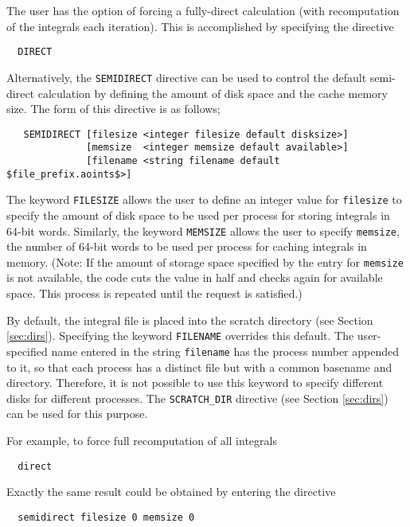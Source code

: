 The user has the option of forcing a fully-direct calculation (with
recomputation of the integrals each iteration).  This is accomplished
by specifying the directive

\begin{verbatim}
  DIRECT
\end{verbatim}

Alternatively, the \verb+SEMIDIRECT+ directive can be used to control
the default semi-direct calculation by defining the amount of disk
space and the cache memory size.  The form of this directive is as
follows;

\begin{verbatim}
   SEMIDIRECT [filesize <integer filesize default disksize>] 
              [memsize  <integer memsize default available>]
              [filename <string filename default $file_prefix.aoints$>]
\end{verbatim}

The keyword \verb+FILESIZE+ allows the user to define an integer value
for \verb+filesize+ to specify the amount of disk space to be used per
process for storing integrals in 64-bit words.  Similarly, the keyword
\verb+MEMSIZE+ allows the user to specify \verb+memsize+, the number
of 64-bit words to be used per process for caching integrals in
memory. (Note: If the amount of storage space specified by the entry
for \verb+memsize+ is not available, the code cuts the value in half
and checks again for available space.  This process is repeated until
the request is satisfied.)  

By default, the integral file is placed into the scratch directory
(see Section \ref{sec:dirs}). Specifying the keyword \verb+FILENAME+
overrides this default.  The user-specified name entered in the string
\verb+filename+ has the process number appended to it, so that each
process has a distinct file but with a common basename and directory.
Therefore, it is not possible to use this keyword to specify different
disks for different processes.  The \verb+SCRATCH_DIR+ directive (see
Section \ref{sec:dirs}) can be used for this purpose.

For example, to force full recomputation of all integrals
\begin{verbatim}
  direct
\end{verbatim}

Exactly the same result could be obtained by entering the directive
\begin{verbatim}
  semidirect filesize 0 memsize 0
\end{verbatim}

